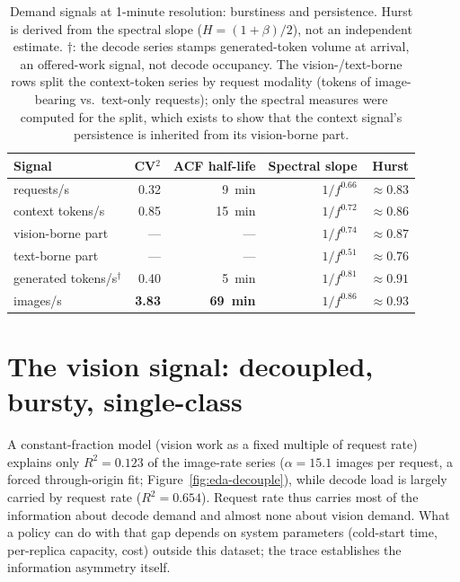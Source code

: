 \begin{table}[htbp]
\centering
\caption[Burstiness and persistence of the demand signals]{Demand signals at
1-minute resolution: burstiness and persistence. Hurst is derived from the
spectral slope ($H = (1+\beta)/2$), not an independent estimate. $\dagger$: the
decode series stamps generated-token volume at arrival, an offered-work signal,
not decode occupancy. The vision-/text-borne rows split the context-token series
by request modality (tokens of image-bearing vs.\ text-only requests); only the
spectral measures were computed for the split, which exists to show that the
context signal's persistence is inherited from its vision-borne part.}
\label{tab:eda-persistence}
\begin{tabular}{lrrrr}
\toprule
Signal & CV$^2$ & ACF half-life & Spectral slope & Hurst \\
\midrule
requests/s            & 0.32 & \SI{9}{\minute}  & $1/f^{0.66}$ & ${\approx}0.83$ \\
context tokens/s      & 0.85 & \SI{15}{\minute} & $1/f^{0.72}$ & ${\approx}0.86$ \\
\quad vision-borne part & --- & ---             & $1/f^{0.74}$ & ${\approx}0.87$ \\
\quad text-borne part   & --- & ---             & $1/f^{0.51}$ & ${\approx}0.76$ \\
generated tokens/s$^\dagger$ & 0.40 & \SI{5}{\minute}  & $1/f^{0.81}$ & ${\approx}0.91$ \\
images/s              & \textbf{3.83} & \textbf{\SI{69}{\minute}} & $1/f^{0.86}$ & $\boldsymbol{{\approx}0.93}$ \\
\bottomrule
\end{tabular}
\end{table}

\section{The vision signal: decoupled, bursty, single-class}
\label{sec:eda-vision}

A constant-fraction model (vision work as a fixed multiple of request rate)
explains only $R^2 = \num{0.123}$ of the image-rate series ($\alpha = 15.1$
images per request, a forced through-origin fit;
Figure~\ref{fig:eda-decouple}), while decode load is largely carried by request
rate ($R^2 = \num{0.654}$). Request rate thus carries most of the information
about decode demand and almost none about vision demand. What a policy can do
with that gap depends on system parameters (cold-start time, per-replica
capacity, cost) outside this dataset;
the trace establishes the information asymmetry itself.

